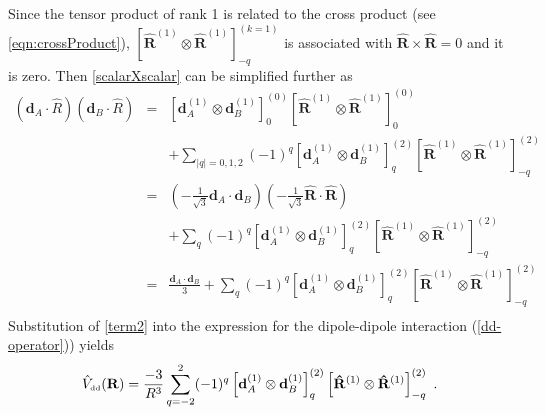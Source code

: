 Since the tensor product of rank 1 is related to the cross product (see \autoref{eqn:crossProduct}), $\left[ \mathbf{\hat{R}}^{(1)} \otimes \mathbf{\hat{R}}^{(1)} \right]^{(k=1)}_{-q}$ is associated with $\mathbf{\hat{R}}\times\mathbf{\hat{R}}=0$ and it is zero. Then \autoref{scalarXscalar} can be simplified further as
\begin{eqnarray}
(\mathbf{d}_{A}\cdot\hat{R})(\mathbf{d}_{B}\cdot\hat{R})&=&\left[ \mathbf{d}_{A}^{(1)} \otimes \mathbf{d}_{B}^{(1)} \right]^{(0)}_{0} \left[ \mathbf{\hat{R}}^{(1)} \otimes \mathbf{\hat{R}}^{(1)} \right]^{(0)}_{0} \nonumber \\
& & + \sum_{|q|=0,1,2} (-1)^{q} \left[ \mathbf{d}_{A}^{(1)} \otimes \mathbf{d}_{B}^{(1)} \right]^{(2)}_{q} \left[ \mathbf{\hat{R}}^{(1)} \otimes \mathbf{\hat{R}}^{(1)} \right]^{(2)}_{-q} \nonumber \\
&=& (-\frac{1}{\sqrt{3}} \mathbf{d}_{A}\cdot \mathbf{d}_{B})(-\frac{1}{\sqrt{3}}\mathbf{\hat{R}}\cdot\mathbf{\hat{R}} ) \nonumber \\
& & +  \sum_{q} (-1)^{q} \left[ \mathbf{d}_{A}^{(1)} \otimes \mathbf{d}_{B}^{(1)} \right]^{(2)}_{q} \left[ \mathbf{\hat{R}}^{(1)} \otimes \mathbf{\hat{R}}^{(1)} \right]^{(2)}_{-q} \nonumber \\
&=& \frac{\mathbf{d}_{A}\cdot \mathbf{d}_{B}}{3}+  \sum_{q} (-1)^{q} \left[ \mathbf{d}_{A}^{(1)} \otimes \mathbf{d}_{B}^{(1)} \right]^{(2)}_{q} \left[ \mathbf{\hat{R}}^{(1)} \otimes \mathbf{\hat{R}}^{(1)} \right]^{(2)}_{-q} \nonumber \\ 
\label{term2}
\end{eqnarray}
Substitution of \autoref{term2} into the expression for the dipole-dipole interaction (\autoref{dd-operator})) yields
\begin{equation}
\hat{V}_{\mbox{\tiny dd}}(\mathbf{R}) = \frac{-3}{R^{3}} \sum_{q=-2}^{2} (-1)^{q} \left[ \mathbf{d}_{A}^{(1)} \otimes \mathbf{d}_{B}^{(1)} \right]^{(2)}_{q} \left[ \mathbf{\hat{R}}^{(1)} \otimes \mathbf{\hat{R}}^{(1)} \right]^{(2)}_{-q} \ .
\end{equation}





